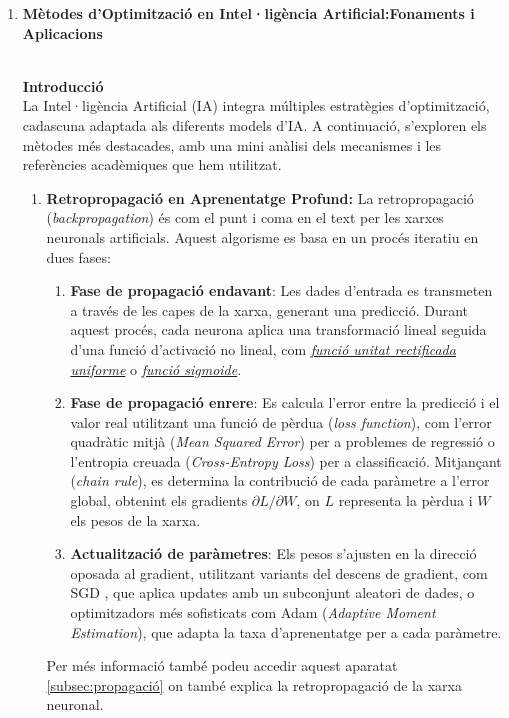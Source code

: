 \begin{enumerate}
   \item \hypertarget{Optimització i Ajustos}{\textbf{Mètodes d'Optimització en Intel·ligència Artificial:Fonaments i Aplicacions}}\\
   \textbf{Introducció}\\
La Intel·ligència Artificial (IA) integra múltiples estratègies d'optimització, cadascuna adaptada als diferents models d'IA. A continuació, s'exploren els mètodes més destacades, amb una mini anàlisi dels mecanismes i les referències acadèmiques que hem utilitzat.

\begin{enumerate}
 \item \textbf{Retropropagació en Aprenentatge Profund:} La retropropagació (\textit{backpropagation}) és com el punt i coma en el text per les xarxes neuronals artificials. Aquest algorisme es basa en un procés iteratiu en dues fases:
    \begin{enumerate}
     \item \textbf{Fase de propagació endavant}: Les dades d'entrada es transmeten a través de les capes de la xarxa, generant una predicció. Durant aquest procés, cada neurona aplica una transformació lineal seguida d'una funció d'activació no lineal, com \textit{\hyperlink{subsec:1}{funció unitat rectificada uniforme}} o \textit{\hyperlink{3.7.1}{funció sigmoide}}.

     \item \textbf{Fase de propagació enrere}: Es calcula l'error entre la predicció i el valor real utilitzant una funció de pèrdua (\textit{loss function}), com l'error quadràtic mitjà (\textit{Mean Squared Error}) per a problemes de regressió o l'entropia creuada (\textit{Cross-Entropy Loss}) per a classificació. Mitjançant  (\textit{chain rule}), es determina la contribució de cada paràmetre a l'error global, obtenint els gradients $\partial L/\partial W$, on $L$ representa la pèrdua i $W$ els pesos de la xarxa.

     \item \textbf{Actualització de paràmetres}: Els pesos s'ajusten en la direcció oposada al gradient, utilitzant variants del descens de gradient, com SGD \textit{}, que aplica updates amb un subconjunt aleatori de dades, o optimitzadors més sofisticats com Adam (\textit{Adaptive Moment Estimation}), que adapta la taxa d'aprenentatge per a cada paràmetre.
    \end{enumerate}
 Per més informació també podeu accedir aquest  aparatat \ref{subsec:propagació} on també explica la retropropagació de la xarxa neuronal.


\end{enumerate}
\end{enumerate}
